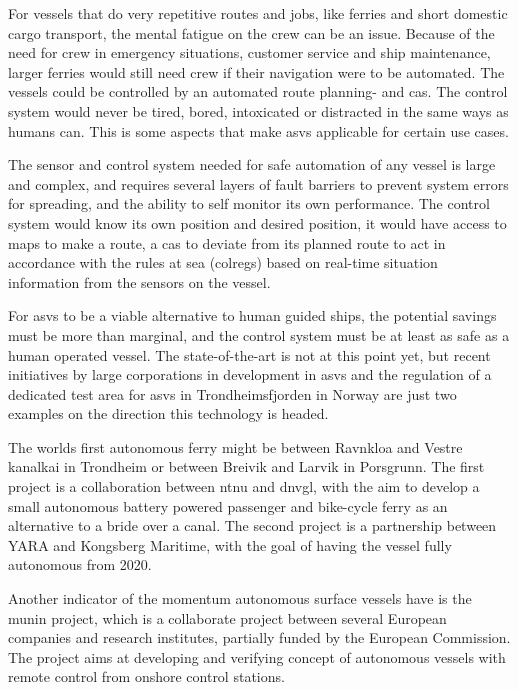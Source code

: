 For vessels that do very repetitive routes and jobs, like ferries and short domestic cargo transport, the mental fatigue on the crew can be an issue. Because of the need for crew in emergency situations, customer service and ship maintenance, larger ferries would still need crew if their navigation were to be automated. The vessels could be controlled by an automated route planning- and \gls{cas}. The control system would never be tired, bored, intoxicated or distracted in the same ways as humans can. This is some aspects that make \glspl{asv} applicable for certain use cases.

The sensor and control system needed for safe automation of any vessel is large and complex, and requires several layers of fault barriers to prevent system errors for spreading, and the ability to self monitor its own performance. The control system would know its own position and desired position, it would have access to maps to make a route, a \gls{cas} to deviate from its planned route to act in accordance with the rules at sea (\gls{colregs}) based on real-time situation information from the sensors on the vessel.

For \glspl{asv} to be a viable alternative to human guided ships, the potential savings must be more than marginal, and the control system must be at least as safe as a human operated vessel. The state-of-the-art is not at this point yet, but recent initiatives by large corporations in development in \glspl{asv} and the regulation of a dedicated test area for \glspl{asv} in Trondheimsfjorden in Norway are just two examples on the direction this technology is headed.

The worlds first autonomous ferry might be between Ravnkloa and Vestre kanalkai in Trondheim or between Breivik and Larvik in Porsgrunn. The first project is a collaboration between \gls{ntnu} and \gls{dnvgl}, with the aim to develop a small autonomous battery powered passenger and bike-cycle ferry as an alternative to a bride over a canal. The second project is a partnership between YARA and Kongsberg Maritime, with the goal of having the vessel fully autonomous from 2020.

Another indicator of the momentum autonomous surface vessels have is the \gls{munin} project, which is a collaborate project between several European companies and research institutes, partially funded by the European Commission. The project aims at developing and verifying concept of autonomous vessels with remote control from onshore control stations.

